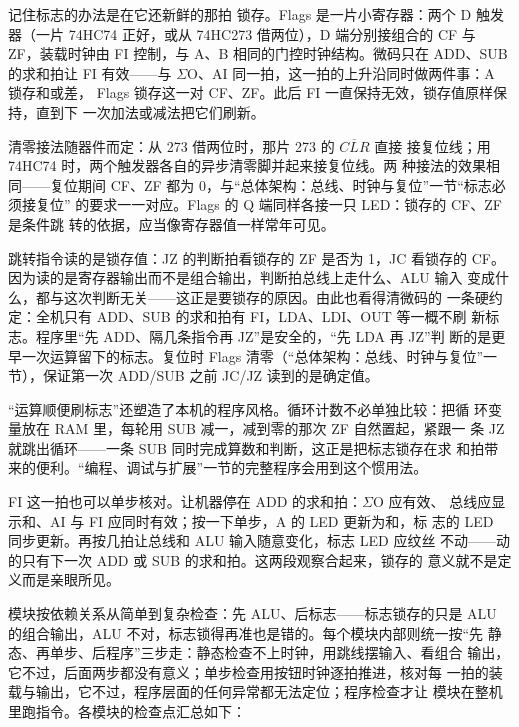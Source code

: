 记住标志的办法是在它还新鲜的那拍
锁存。Flags 是一片小寄存器：两个 D 触发器（一片 74HC74 正好，或从
74HC273 借两位），D 端分别接组合的 CF 与 ZF，装载时钟由 FI 控制，与
A、B 相同的门控时钟结构。微码只在 ADD、SUB 的求和拍让 FI 有效——与
$\Sigma$O、AI 同一拍，这一拍的上升沿同时做两件事：A 锁存和或差，
Flags 锁存这一对 CF、ZF。此后 FI 一直保持无效，锁存值原样保持，直到下
一次加法或减法把它们刷新。

清零接法随器件而定：从 273 借两位时，那片 273 的 $\overline{CLR}$ 直接
接复位线；用 74HC74 时，两个触发器各自的异步清零脚并起来接复位线。两
种接法的效果相同——复位期间 CF、ZF 都为 0，与“总体架构：总线、时钟与复位”一节“标志必须接复位”
的要求一一对应。Flags 的 Q 端同样各接一只 LED：锁存的 CF、ZF 是条件跳
转的依据，应当像寄存器值一样常年可见。

跳转指令读的是锁存值：JZ 的判断拍看锁存的 ZF 是否为 1，JC 看锁存的
CF。因为读的是寄存器输出而不是组合输出，判断拍总线上走什么、ALU 输入
变成什么，都与这次判断无关——这正是要锁存的原因。由此也看得清微码的
一条硬约定：全机只有 ADD、SUB 的求和拍有 FI，LDA、LDI、OUT 等一概不刷
新标志。程序里“先 ADD、隔几条指令再 JZ”是安全的，“先 LDA 再 JZ”判
断的是更早一次运算留下的标志。复位时 Flags 清零（“总体架构：总线、时钟与复位”一节），保证第一次
ADD/SUB 之前 JC/JZ 读到的是确定值。

“运算顺便刷标志”还塑造了本机的程序风格。循环计数不必单独比较：把循
环变量放在 RAM 里，每轮用 SUB 减一，减到零的那次 ZF 自然置起，紧跟一
条 JZ 就跳出循环——一条 SUB 同时完成算数和判断，这正是把标志锁存在求
和拍带来的便利。“编程、调试与扩展”一节的完整程序会用到这个惯用法。

FI 这一拍也可以单步核对。让机器停在 ADD 的求和拍：$\Sigma$O 应有效、
总线应显示和、AI 与 FI 应同时有效；按一下单步，A 的 LED 更新为和，标
志的 LED 同步更新。再按几拍让总线和 ALU 输入随意变化，标志 LED 应纹丝
不动——动的只有下一次 ADD 或 SUB 的求和拍。这两段观察合起来，锁存的
意义就不是定义而是亲眼所见。

模块按依赖关系从简单到复杂检查：先 ALU、后标志——标志锁存的只是 ALU
的组合输出，ALU 不对，标志锁得再准也是错的。每个模块内部则统一按“先
静态、再单步、后程序”三步走：静态检查不上时钟，用跳线摆输入、看组合
输出，它不过，后面两步都没有意义；单步检查用按钮时钟逐拍推进，核对每
一拍的装载与输出，它不过，程序层面的任何异常都无法定位；程序检查才让
模块在整机里跑指令。各模块的检查点汇总如下：


